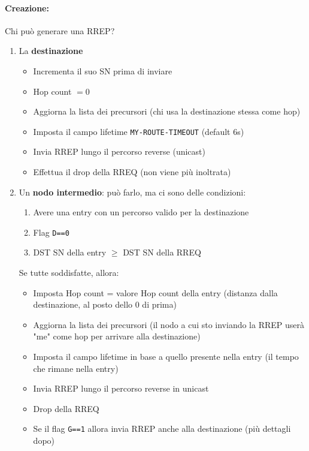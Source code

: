 \paragraph{Creazione:} Chi può generare una RREP?
\begin{enumerate}
	\item La \textbf{destinazione}
	\begin{itemize}
		\item Incrementa il suo SN prima di inviare

		\item Hop count $= 0$

		\item Aggiorna la lista dei precursori (chi usa la destinazione stessa come hop)

		\item Imposta il campo lifetime \texttt{MY-ROUTE-TIMEOUT} (default 6s)

		\item Invia RREP lungo il percorso reverse (unicast)

		\item Effettua il drop della RREQ (non viene più inoltrata)
	\end{itemize}
	
	\item Un \textbf{nodo intermedio}: può farlo, ma ci sono delle condizioni:
	\begin{enumerate}
		\item Avere una entry con un percorso valido per la destinazione

		\item Flag \texttt{D==0}

		\item DST SN della entry $\geq$ DST SN della RREQ
	\end{enumerate}
	Se tutte soddisfatte, allora:
	\begin{itemize}
		\item Imposta Hop count = valore Hop count della entry (distanza dalla destinazione, al posto dello 0 di prima)

		\item Aggiorna la lista dei precursori (il nodo a cui sto inviando la RREP userà "me" come hop per arrivare alla destinazione)

		\item Imposta il campo lifetime in base a quello presente nella entry (il tempo che rimane nella entry)

		\item Invia RREP lungo il percorso reverse in unicast

		\item Drop della RREQ

		\item Se il flag \texttt{G==1} allora invia RREP anche alla destinazione (più dettagli dopo)
	\end{itemize}
\end{enumerate}

